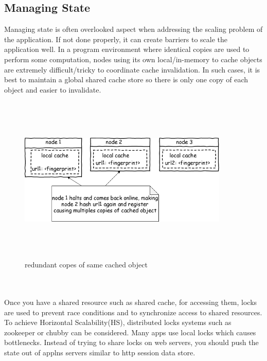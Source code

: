 \subsection{Managing State}\label{managestate}
Managing state is often overlooked aspect when addressing the scaling problem of the application. If not done properly, it can create barriers to scale the application well. In a program environment where identical copies are used to perform some
computation, nodes using its own local/in-memory to cache objects are extremely
difficult/tricky to coordinate cache invalidation. In such cases, it is best to
maintain a global shared cache store so there is only one copy of each object and
easier to invalidate.
\begin{figure}[h!]
  \centering
  \includegraphics[width=10cm,height=8cm,keepaspectratio]{../media/crawler/multi-cache-wrng.png}
  \caption{redundant copes of same cached object}
  \label{fig:wrngcache}
\end{figure}
\\
\\
\noindent
Once you have a shared resource such as shared cache, for accessing them, locks are used to prevent race conditions and to synchronize access to shared resources. To achieve Horizontal Scalability(HS), distributed locks systems such as zookeeper \cite{zookeeper} or chubby \cite{chubby} can be considered. Many apps use local locks which causes bottlenecks. Instead of trying to share locks on web servers, you
should push the state out of applns servers similar to http session data store.
